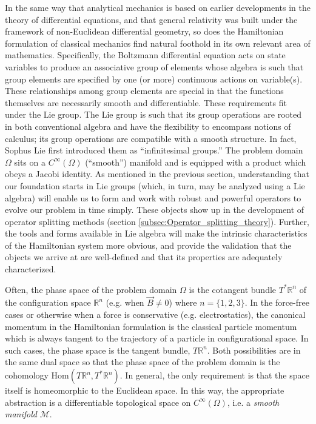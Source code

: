 \documentclass[11pt,titlepage]{report}
\begin{document}
\indent \indent In the same way that analytical mechanics is based on earlier developments in the theory of differential equations, and that general relativity was built under the framework of non-Euclidean differential geometry, so does the Hamiltonian formulation of classical mechanics find natural foothold in its own relevant area of mathematics. Specifically, the Boltzmann differential equation acts on state variables to produce an associative group of elements whose algebra is such that group elements are specified by one (or more) continuous actions on variable(s). These relationships among group elements are special in that the functions themselves are necessarily smooth and differentiable. These requirements fit under the Lie group. The Lie group is such that its group operations are rooted in both conventional algebra and have the flexibility to encompass notions of calculus; its group operations are compatible with a smooth structure. In fact, Sophus Lie first introduced them as ``infinitesimal groups.'' The problem domain $\Omega$ sits on a $C^{\infty}(\Omega )$ (``smooth'') manifold and is equipped with a product which obeys a Jacobi identity. As mentioned in the previous section, understanding that our foundation starts in Lie groups (which, in turn, may be analyzed using a Lie algebra) will enable us to form and work with robust and powerful operators to evolve our problem in time simply. These objects show up in the development of operator splitting methods (section \ref{subsec:Operator_splitting_theory}). Further, the tools and forms available in Lie algebra will make the intrinsic characteristics of the Hamiltonian system more obvious, and provide the validation that the objects we arrive at are well-defined and that its properties are adequately characterized.

Often, the phase space of the problem domain $\Omega$ is the cotangent bundle $T^*\mathbb{R}^n$ of the configuration space $\mathbb{R}^n$  (e.g. when $\vec{B} \neq 0$) where $n = \{1,2,3\}$. In the force-free cases or otherwise when a force is conservative  (e.g. electrostatics), the canonical momentum in the Hamiltonian formulation is the classical particle momentum which is always tangent to the trajectory of a particle in configurational space. In such cases, the phase space is the tangent bundle, $T\mathbb{R}^n$. Both possibilities are in the same dual space so that the phase space of the problem domain is the cohomology $\mathrm{Hom}(T\mathbb{R}^n,T^*\mathbb{R}^n)$. In general, the only requirement is that the space itself is homeomorphic to the Euclidean space. In this way, the appropriate abstraction is a differentiable topological space on $C^{\infty}(\Omega )$, i.e. a \emph{smooth manifold} $\mathcal{M}$.
\end{document}
